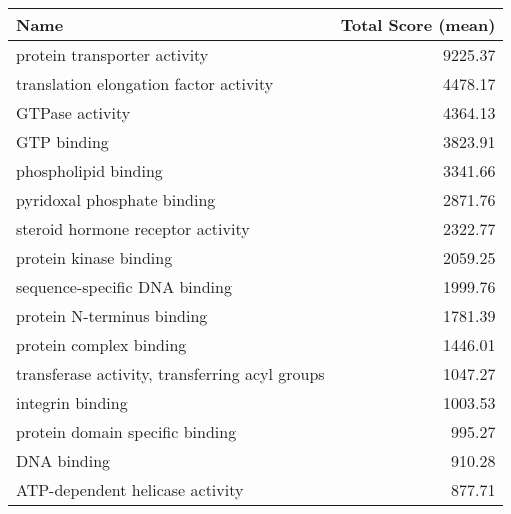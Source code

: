 \begin{table}[h]
\begin{center} \sf
\begin{tabular}{p{}r}
\toprule
\textbf{Name}                                                 & \textbf{Total Score (mean)} \\ \midrule
protein transporter activity                                  & 9225.37                     \\
translation elongation factor activity                        & 4478.17                     \\ %
GTPase activity                                               & 4364.13                     \\
GTP binding                                                   & 3823.91                     \\
phospholipid binding                                          & 3341.66                     \\
pyridoxal phosphate binding                                   & 2871.76                     \\
steroid hormone receptor activity                             & 2322.77                     \\ %
protein kinase binding                                        & 2059.25                     \\
sequence-specific DNA binding                                 & 1999.76                     \\ %
protein N-terminus binding                                    & 1781.39                     \\
protein complex binding                                       & 1446.01                     \\
transferase activity, transferring acyl groups                & 1047.27                     \\
integrin binding                                              & 1003.53                     \\
protein domain specific binding                               & 995.27                      \\
DNA binding                                                   & 910.28                      \\ %
ATP-dependent helicase activity                               & 877.71                      \\

\end{tabular}
\end{center}
\end{table}
